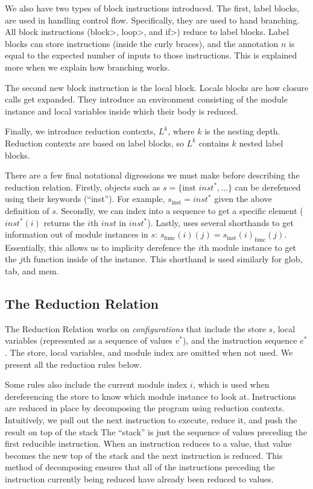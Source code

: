 We also have two types of block instructions introduced.
The first, label blocks, are used in handling control flow.
Specifically, they are used to hand branching.
All block instructions (\<block>, \<loop>, and \<if>) reduce to label blocks.
Label blocks can store instructions (inside the curly braces), and the annotation $n$ is equal to the expected number of inputs to those instructions.
This is explained more when we explain how branching works.

The second new block instruction is the local block.
Locals blocks are how closure calls get expanded.
They introduce an environment consisting of the module instance and local variables inside which their body is reduced.

Finally, we introduce reduction contexts, $L^{k}$, where $k$ is the nesting depth.
Reduction contexts are based on label blocks, so $L^{k}$ contains $k$ nested label blocks.

There are a few final notational digressions we must make before describing the reduction relation.
Firstly, objects such as $s=\{\text{inst } inst^{*}, \dots \}$ can be derefenced using their keywords (\eg ``inst'').
For example, $s_\text{inst}=inst^{*}$ given the above definition of $s$.
Secondly, we can index into a sequence to get a specific element (\eg $inst^{*}(i)$ returns the $i$th $inst$ in $inst^{*}$).
Lastly, \wasm uses several shorthands to get information out of module instances in $s$: $s_\text{func}(i)(j)=s_\text{inst}(i)_\text{func}(j)$.
Essentially, this allows us to implicity derefence the $i$th module instance to get the $j$th function inside of the instance.
This shorthand is used similarly for glob, tab, and mem.

\subsection{The \wasm Reduction Relation}
The \wasm Reduction Relation works on \emph{configurations} that include the store $s$, local variables (represented as a sequence of values $v^{*}$), and the instruction sequence $e^{*}$.
The store, local variables, and module index are omitted when not used.
We present all the reduction rules below.

\begin{mathpar}
\end{mathpar}

Some rules also include the current module index $i$, which is used when dereferencing the store to know which module instance to look at.
Instructions are reduced in place by decomposing the program using reduction contexts.
Intuitively, we pull out the next instruction to execute, reduce it, and push the result on top of the stack
The ``stack'' is just the sequence of values preceding the first reducible instruction.
When an instruction reduces to a value, that value becomes the new top of the stack and the next instruction is reduced.
This method of decomposing ensures that all of the instructions preceding the instruction currently being reduced have already been reduced to values.

